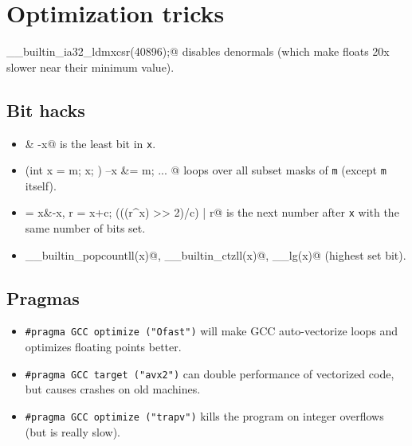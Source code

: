 \section{Optimization tricks}
	\verb@__builtin_ia32_ldmxcsr(40896);@ disables denormals (which make floats 20x slower near their minimum value).
	\subsection{Bit hacks}
		\begin{itemize}
			\item \verb@x & -x@ is the least bit in \texttt{x}.
			\item \verb@for (int x = m; x; ) { --x &= m; ... }@ loops over all subset masks of \texttt{m} (except \texttt{m} itself).
			\item \verb@c = x&-x, r = x+c; (((r^x) >> 2)/c) | r@ is the next number after \texttt{x} with the same number of bits set.
			\item \verb@__builtin_popcountll(x)@, \verb@__builtin_ctzll(x)@, \verb@__lg(x)@ (highest set bit).
		\end{itemize}
	\subsection{Pragmas}
		\begin{itemize}
			\item \lstinline{#pragma GCC optimize ("Ofast")} will make GCC auto-vectorize loops and optimizes floating points better.
			\item \lstinline{#pragma GCC target ("avx2")} can double performance of vectorized code, but causes crashes on old machines.
			\item \lstinline{#pragma GCC optimize ("trapv")} kills the program on integer overflows (but is really slow).
		\end{itemize}
